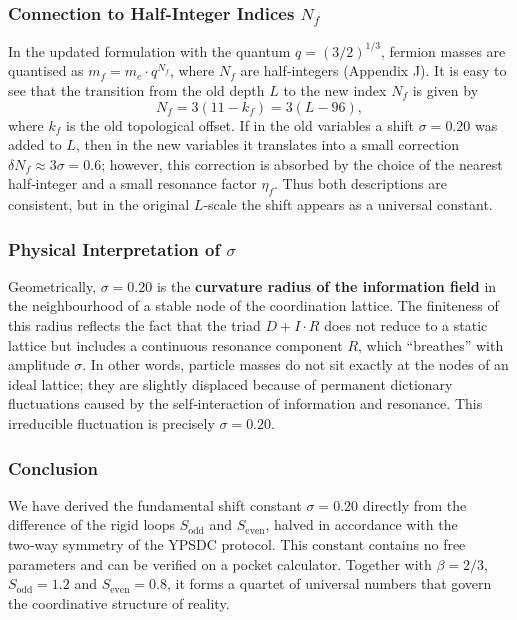 \documentclass[12pt,a4paper]{article}
\begin{document}
	\subsubsection{Connection to Half‑Integer Indices \(N_f\)}
	
	In the updated formulation with the quantum \(q = (3/2)^{1/3}\), fermion masses are quantised as \(m_f = m_e \cdot q^{N_f}\), where \(N_f\) are half‑integers (Appendix J). It is easy to see that the transition from the old depth \(L\) to the new index \(N_f\) is given by
	\[
	N_f = 3(11 - k_f) = 3(L - 96),
	\]
	where \(k_f\) is the old topological offset. If in the old variables a shift \(\sigma = 0.20\) was added to \(L\), then in the new variables it translates into a small correction \(\delta N_f \approx 3\sigma = 0.6\); however, this correction is absorbed by the choice of the nearest half‑integer and a small resonance factor \(\eta_f\). Thus both descriptions are consistent, but in the original \(L\)‑scale the shift appears as a universal constant.
	
	\subsubsection{Physical Interpretation of \(\sigma\)}
	
	Geometrically, \(\sigma = 0.20\) is the \textbf{curvature radius of the information field} in the neighbourhood of a stable node of the coordination lattice. The finiteness of this radius reflects the fact that the triad \(D+I\cdot R\) does not reduce to a static lattice but includes a continuous resonance component \(R\), which “breathes” with amplitude \(\sigma\). In other words, particle masses do not sit exactly at the nodes of an ideal lattice; they are slightly displaced because of permanent dictionary fluctuations caused by the self‑interaction of information and resonance. This irreducible fluctuation is precisely \(\sigma = 0.20\).
	
	\subsubsection{Conclusion}
	
	We have derived the fundamental shift constant \(\sigma = 0.20\) directly from the difference of the rigid loops \(S_{\mathrm{odd}}\) and \(S_{\mathrm{even}}\), halved in accordance with the two‑way symmetry of the YPSDC protocol. This constant contains no free parameters and can be verified on a pocket calculator. Together with \(\beta = 2/3\), \(S_{\mathrm{odd}} = 1.2\) and \(S_{\mathrm{even}} = 0.8\), it forms a quartet of universal numbers that govern the coordinative structure of reality.
	
\end{document}
